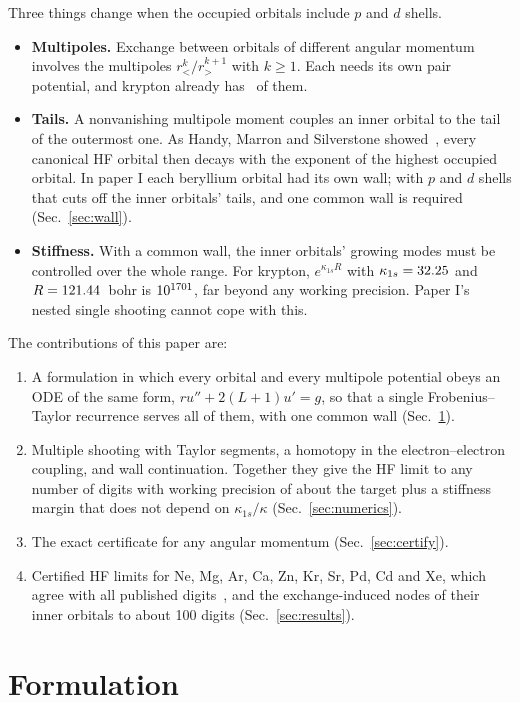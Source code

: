 \documentclass[aps,pra,reprint,superscriptaddress,amsmath,amssymb,longbibliography]{revtex4-2}
\begin{document}
Three things change when the occupied orbitals include $p$ and $d$ shells.
\begin{itemize}
\item \textbf{Multipoles.} Exchange between orbitals of different angular momentum involves the multipoles $r_<^k/r_>^{k+1}$ with $k\ge1$. Each needs its own pair potential, and krypton already has \KrPots\ of them.
\item \textbf{Tails.} A nonvanishing multipole moment couples an inner orbital to the tail of the outermost one. As Handy, Marron and Silverstone showed~\cite{HMS1969}, every canonical HF orbital then decays with the exponent of the highest occupied orbital. In paper I each beryllium orbital had its own wall; with $p$ and $d$ shells that cuts off the inner orbitals' tails, and one common wall is required (Sec.~\ref{sec:wall}).
\item \textbf{Stiffness.} With a common wall, the inner orbitals' growing modes must be controlled over the whole range. For krypton, $e^{\kappa_{1s}R}$ with $\kappa_{1s}=32.25$ and $R=121.44$~bohr is $10^{1701}$, far beyond any working precision. Paper I's nested single shooting cannot cope with this.
\end{itemize}
The contributions of this paper are:
\begin{enumerate}
\item A formulation in which every orbital and every multipole potential obeys an ODE of the same form, $ru''+2(L+1)u'=g$, so that a single Frobenius--Taylor recurrence serves all of them, with one common wall (Sec.~\ref{sec:formulation}).
\item Multiple shooting with Taylor segments, a homotopy in the electron--electron coupling, and wall continuation. Together they give the HF limit to any number of digits with working precision of about the target plus a stiffness margin that does not depend on $\kappa_{1s}/\kappa$ (Sec.~\ref{sec:numerics}).
\item The exact certificate for any angular momentum (Sec.~\ref{sec:certify}).
\item Certified HF limits for Ne, Mg, Ar, Ca, Zn, Kr, Sr, Pd, Cd and Xe, which agree with all published digits~\cite{Cinal2020}, and the exchange-induced nodes of their inner orbitals to about 100 digits (Sec.~\ref{sec:results}).
\end{enumerate}

\section{Formulation}\label{sec:formulation}
\end{document}
